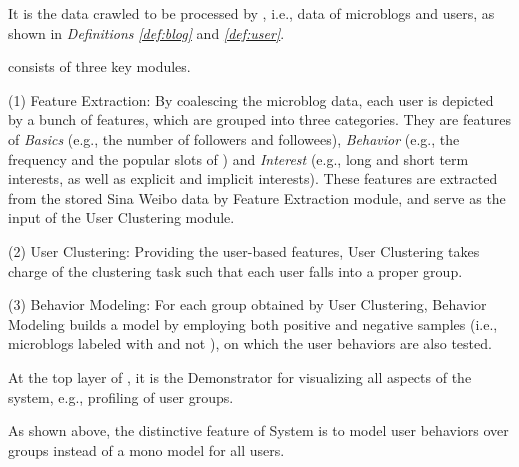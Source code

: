  It is the data crawled to be processed by \sys{}, i.e., data of microblogs and users, as shown in \textit{Definitions} \textit{\ref{def:blog}} and \textit{\ref{def:user}}.

\sys{} consists of three key modules.

	\stab(1)  Feature Extraction: By coalescing the microblog data, each user is depicted by a bunch of features, which are grouped into three categories. They are features of \textit{Basics} (e.g., the number of followers and followees), \textit{Behavior} (e.g., the frequency and the popular slots of \retg{}) and \textit{Interest} (e.g., long and short term interests, as well as explicit and implicit interests). These features are extracted from the stored  Sina Weibo data by Feature Extraction module, and serve as the input of the User Clustering module.
	
	\stab(2)  User Clustering: Providing the user-based features, User Clustering takes charge of the clustering task such that each user falls into a proper group.
	
	\stab(3)  Behavior Modeling: For each group obtained by User Clustering, Behavior Modeling builds a  model by employing both positive and negative samples (i.e., microblogs labeled with \retd{} and not \retd{}), on which the user \retg{} behaviors are also tested.
	
 At the top layer of \sys{}, it is the Demonstrator for visualizing all aspects of the system, e.g., profiling of user groups.


As shown above, the distinctive feature of System  \sys{} is to model user \retg{} behaviors over groups instead of a mono model for all users.

